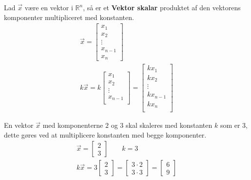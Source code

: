 \begin{defn}
Lad $\vec{x}$ være en vektor i $\mathds{R}^n$, så er et \textbf{Vektor skalar} produktet af den vektorens komponenter multipliceret med konstanten.
\begin{align*}
\vec{x}=\begin{bmatrix}
x_1\\
x_2\\
\vdots\\
x_{n-1}\\
x_n
\end{bmatrix}\\
k\vec{x}=k\begin{bmatrix}
x_1\\
x_2\\
\vdots\\
x_{n-1}\\
\end{bmatrix}=
\begin{bmatrix}
kx_1\\
kx_2\\
\vdots\\
kx_{n-1}\\
kx_n\\
\end{bmatrix}
\end{align*}
\end{defn}
\begin{eks}
En vektor $\vec{x}$ med komponenterne $2$ og $3$ skal skaleres med konstanten $k$ som er $3$, dette gøres ved at multiplicere konstanten med begge komponenter.
\begin{align*}
\vec{x}=\begin{bmatrix}
2\\
3
\end{bmatrix}\qquad k=3\\
k\vec{x}=3
\begin{bmatrix}
2\\
3
\end{bmatrix}
=
\begin{bmatrix}
3\cdot2\\
3\cdot3
\end{bmatrix}
=
\begin{bmatrix}
6\\
9
\end{bmatrix}
\end{align*}
\end{eks}

